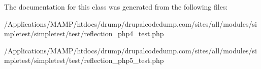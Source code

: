 The documentation for this class was generated from the following files:\begin{DoxyCompactItemize}
\item 
/Applications/MAMP/htdocs/drump/drupalcodedump.com/sites/all/modules/simpletest/simpletest/test/reflection\_\-php4\_\-test.php\item 
/Applications/MAMP/htdocs/drump/drupalcodedump.com/sites/all/modules/simpletest/simpletest/test/reflection\_\-php5\_\-test.php\end{DoxyCompactItemize}
